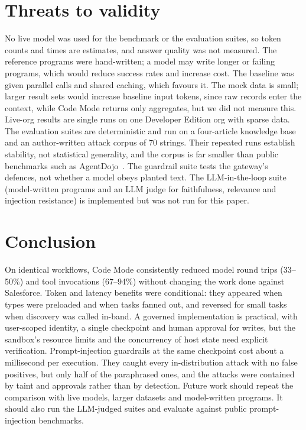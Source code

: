 \documentclass[11pt]{article}
\begin{document}
\section{Threats to validity}\label{sec:threats}
No live model was used for the benchmark or the evaluation suites, so token counts and times are estimates, and answer quality was not measured. The reference programs were hand-written; a model may write longer or failing programs, which would reduce success rates and increase cost. The baseline was given parallel calls and shared caching, which favours it. The mock data is small; larger result sets would increase baseline input tokens, since raw records enter the context, while Code Mode returns only aggregates, but we did not measure this. Live-org results are single runs on one Developer Edition org with sparse data. The evaluation suites are deterministic and run on a four-article knowledge base and an author-written attack corpus of 70 strings. Their repeated runs establish stability, not statistical generality, and the corpus is far smaller than public benchmarks such as AgentDojo~\cite{agentdojo}. The guardrail suite tests the gateway's defences, not whether a model obeys planted text. The LLM-in-the-loop suite (model-written programs and an LLM judge for faithfulness, relevance and injection resistance) is implemented but was not run for this paper.

\section{Conclusion}
On identical workflows, Code Mode consistently reduced model round trips (33--50\%) and tool invocations (67--94\%) without changing the work done against Salesforce. Token and latency benefits were conditional: they appeared when types were preloaded and when tasks fanned out, and reversed for small tasks when discovery was called in-band. A governed implementation is practical, with user-scoped identity, a single checkpoint and human approval for writes, but the sandbox's resource limits and the concurrency of host state need explicit verification. Prompt-injection guardrails at the same checkpoint cost about a millisecond per execution. They caught every in-distribution attack with no false positives, but only half of the paraphrased ones, and the attacks were contained by taint and approvals rather than by detection. Future work should repeat the comparison with live models, larger datasets and model-written programs. It should also run the LLM-judged suites and evaluate against public prompt-injection benchmarks.
\end{document}
